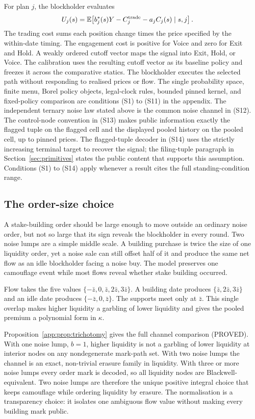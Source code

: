 \documentclass[11pt]{article}
\newcommand{\Eop}{\mathbb{E}}
\begin{document}
For plan $j$, the blockholder evaluates
\[
U_j(s)=\Eop\!\left[b_j^*(s)Y-C_j^{\rm trade}-a_jC_j(s)\mid s,j\right].
\]
The trading cost sums each position change times the price specified by the within-date timing.
The engagement cost is positive for Voice and zero for Exit and Hold. A weakly ordered cutoff
vector maps the signal into Exit, Hold, or Voice. The calibration uses the resulting cutoff
vector as its baseline policy and freezes it across the comparative statics. The blockholder
executes the selected path without responding to realised prices or flow. The single probability
space, finite menu, Borel policy objects, legal-clock rules, bounded pinned kernel, and fixed-policy
comparison are conditions (S1) to (S11) in the appendix. The independent ternary noise law stated
above is the common noise channel in (S12). The control-node convention in (S13) makes public
information exactly the flagged tuple on the flagged cell and the displayed pooled history on the
pooled cell, up to pinned prices. The flagged-tuple decoder in (S14) uses the strictly increasing
terminal target to recover the signal; the filing-tuple paragraph in Section~\ref{sec:primitives}
states the public content that supports this assumption. Conditions (S1) to (S14) apply whenever a
result cites the full standing-condition range.

\subsection{The order-size choice}
\label{sec:ordersize}

A stake-building order should be large enough to move outside an ordinary noise order, but not so
large that its sign reveals the blockholder in every round. Two noise lumps are a simple middle
scale. A building purchase is twice the size of one liquidity order, yet a noise sale can still
offset half of it and produce the same net flow as an idle blockholder facing a noise buy. The model
preserves one camouflage event while most flows reveal whether stake building occurred.

Flow takes the five values
$\{-\bar z,0,\bar z,2\bar z,3\bar z\}$. A building date produces
$\{\bar z,2\bar z,3\bar z\}$ and an idle date produces
$\{-\bar z,0,\bar z\}$. The supports meet only at $\bar z$. This single overlap makes higher
liquidity a garbling of lower liquidity and gives the pooled premium a polynomial form in
$\kappa$.

Proposition~\ref{app:prop:trichotomy} gives the full channel comparison (PROVED). With one noise
lump, $b=1$, higher liquidity is not a garbling of lower liquidity at interior nodes on any
nondegenerate mark-path set. With two noise lumps the channel is an exact, non-trivial erasure
family in liquidity. With three or more noise lumps every order mark is decoded, so all liquidity
nodes are Blackwell-equivalent. Two noise lumps are therefore the unique positive integral choice
that keeps camouflage while ordering liquidity by erasure. The normalisation is a transparency
choice: it isolates one ambiguous flow value without making every building mark public.
\end{document}
